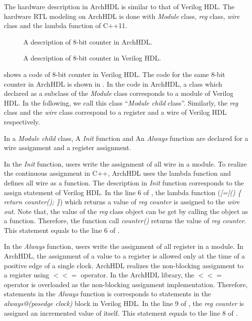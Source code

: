 The hardware description in ArchHDL is similar to that of Verilog HDL.
The hardware RTL modeling on ArchHDL is done with
\textit{Module} class, \textit{reg} class, \textit{wire} class
and the lambda function of C++11.

\begin{figure}[t]
 
 \caption{A description of 8-bit counter in ArchHDL.}
 \label{src:counter}
\end{figure}

\begin{figure}[t]
 
 \caption{A description of 8-bit counter in Verilog HDL.}
 \label{src:counter_v}
\end{figure}

 shows a code of 8-bit counter in Verilog HDL.
The code for the same 8-bit counter in ArchHDL is shown
in .
In the code in ArchHDL,
a class which declared as a subclass of the \textit{Module} class
corresponds to a module of Verilog HDL.
In the following, we call this class ``\textit{Module child} class''.
Similarly, the \textit{reg} class and the \textit{wire} class
correspond to a register and a wire of Verilog HDL respectively.

In a \textit{Module child} class, A \textit{Init} function and An \textit{Always} function are declared for a wire assignment and a register assignment.

In the \textit{Init} function, users write the assignment of all wire in a module.
To realize the continuous assignment in C++, ArchHDL uses the lambda function and defines all wire as a function.
The description in \textit{Init} function corresponds to the assign statement of Verilog HDL.
In the line 6 of , the lambda function (\textit{[=]() \{ return counter(); \}}) which returns a value of \textit{reg counter} is assigned to the \textit{wire out}.
Note that, the value of the \textit{reg} class object can be get by calling the object as a function.
Therefore, the function call \textit{counter()} returns the value of \textit{reg counter}.
This statement equals to the line 6 of .

In the \textit{Always} function, users write the assignment of all register in a module.
In ArchHDL, the assignment of a value to a register is allowed only at the time of a positive edge of a single clock.
ArchHDL realizes the non-blocking assignment to a register using $<<=$ operator.
In the ArchHDL library, the $<<=$ operator is overloaded as the non-blocking assignment implementation.
Therefore, statements in the \textit{Always} function is corresponds to statements in the \textit{always@(posedge clock)} block in Verilog HDL.
In the line 9 of , the \textit{reg counter} is assigned an incremented value of itself.
This statement equals to the line 8 of .

